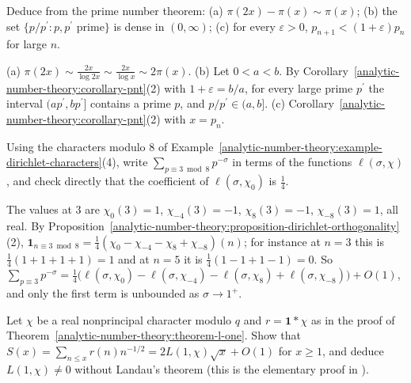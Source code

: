 \begin{exercise}\label{analytic-number-theory:exercise-pnt-consequences}
Deduce from the prime number theorem: (a) $\pi(2x) - \pi(x) \sim \pi(x)$; (b) the set $\{p/p^{\prime} : p, p^{\prime} \text{ prime}\}$ is dense in $(0, \infty)$; (c) for every $\varepsilon > 0$, $p_{n+1} < (1 + \varepsilon)p_n$
for large $n$.
\end{exercise}

\begin{solution}
(a) $\pi(2x) \sim \frac{2x}{\log 2x} \sim \frac{2x}{\log x} \sim 2\pi(x)$. (b) Let $0 < a < b$. By Corollary~\ref{analytic-number-theory:corollary-pnt}(2) with $1 + \varepsilon = b/a$, for every large prime
$p^{\prime}$ the interval $(ap^{\prime}, bp^{\prime}]$ contains a prime $p$, and $p/p^{\prime} \in (a, b]$. (c) Corollary~\ref{analytic-number-theory:corollary-pnt}(2) with $x = p_n$.
\end{solution}

\begin{exercise}\label{analytic-number-theory:exercise-characters-mod-eight}
Using the characters modulo $8$ of Example~\ref{analytic-number-theory:example-dirichlet-characters}(4), write $\sum_{p \equiv 3 \bmod 8}p^{-\sigma}$ in terms of the functions $\ell(\sigma, \chi)$, and check
directly that the coefficient of $\ell(\sigma, \chi_0)$ is $\frac14$.
\end{exercise}

\begin{solution}
The values at $3$ are $\chi_0(3) = 1$, $\chi_{-4}(3) = -1$, $\chi_8(3) = -1$, $\chi_{-8}(3) = 1$, all real. By Proposition~\ref{analytic-number-theory:proposition-dirichlet-orthogonality}(2),
$\mathbf{1}_{n \equiv 3 \bmod 8} = \frac14(\chi_0 - \chi_{-4} - \chi_8 + \chi_{-8})(n)$; for instance at $n = 3$ this is $\frac14(1 + 1 + 1 + 1) = 1$ and at $n = 5$ it is $\frac14(1 - 1 + 1 - 1) = 0$. So
$\sum_{p \equiv 3}p^{-\sigma} = \frac14\bigl(\ell(\sigma, \chi_0) - \ell(\sigma, \chi_{-4}) - \ell(\sigma, \chi_8) + \ell(\sigma, \chi_{-8})\bigr) + O(1)$, and only the first term is unbounded as $\sigma \to 1^+$.
\end{solution}


\begin{exercise}\label{analytic-number-theory:exercise-elementary-l-one}
Let $\chi$ be a real nonprincipal character modulo $q$ and $r = \mathbf{1} * \chi$ as in the proof of Theorem~\ref{analytic-number-theory:theorem-l-one}. Show that
$S(x) = \sum_{n \leq x}r(n)n^{-1/2} = 2L(1, \chi)\sqrt{x} + O(1)$ for $x \geq 1$, and deduce $L(1, \chi) \neq 0$ without Landau's theorem (this is the elementary proof in \cite{apostol-analytic}).
\end{exercise}

